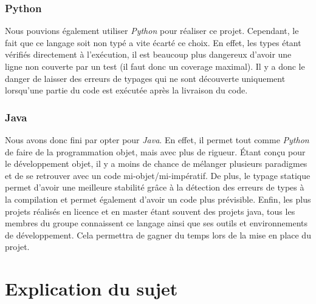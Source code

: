 \documentclass{article}
\begin{document}
\subsubsection{Python}
Nous pouvions également utiliser \textit{Python} pour réaliser ce projet. Cependant, le fait que ce langage
soit non typé a vite écarté ce choix. En effet, les types étant vérifiés directement à l'exécution, il est
beaucoup plus dangereux d'avoir une ligne non couverte par un test (il faut donc un coverage maximal). Il y
a donc le danger de laisser des erreurs de typages qui ne sont découverte uniquement lorsqu’une partie du code
est exécutée après la livraison du code.

\subsubsection{Java}
Nous avons donc fini par opter pour \textit{Java}. En effet, il permet tout comme \textit{Python} de faire
de la programmation objet, mais avec plus de rigueur. Étant conçu pour le développement objet, il y a moins
de chance de mélanger plusieurs paradigmes et de se retrouver avec un code mi-objet/mi-impératif. De plus,
le typage statique permet d'avoir une meilleure stabilité grâce à la détection des erreurs de types à la 
compilation et permet également d'avoir un code plus prévisible. Enfin, les plus projets réalisés en licence
et en master étant souvent des projets java, tous les membres du groupe connaissent ce langage ainsi que ses
outils et environnements de développement. Cela permettra de gagner du temps lors de la mise en place du projet. 

\section{Explication du sujet}
\end{document}

